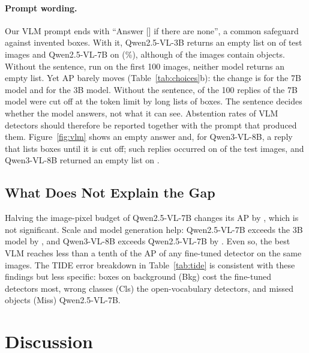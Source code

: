 \documentclass[letterpaper]{article} %
\begin{document}
\paragraph{Prompt wording.}
\label{sec:prompt}
Our VLM prompt ends with ``Answer [] if there are none'', a common safeguard against invented boxes. With it, Qwen2.5-VL-3B returns an empty list on \nEmptyQThree{} of \nRepQThree{} test images and Qwen2.5-VL-7B on \nEmptyQSeven{} (\pctEmptyQSeven\%), although \nImagesWithObjects{} of the images contain objects. Without the sentence, run on the first 100 images, neither model returns an empty list. Yet AP barely moves (Table~\ref{tab:choices}b): the change is \dPromptSeven{} \dciPromptSeven{} for the 7B model and \dPromptThree{} \dciPromptThree{} for the 3B model. Without the sentence, \nCutQSevenNoEmpty{} of the 100 replies of the 7B model were cut off at the token limit by long lists of boxes. The sentence decides whether the model answers, not what it can see. Abstention rates of VLM detectors should therefore be reported together with the prompt that produced them. Figure~\ref{fig:vlm} shows an empty answer and, for Qwen3-VL-8B, a reply that lists boxes until it is cut off; such replies occurred on \nCutQwenVL{} of the \nTestImages{} test images, and Qwen3-VL-8B returned an empty list on \nEmptyQwenVL.

\subsection{What Does Not Explain the Gap}



Halving the image-pixel budget of Qwen2.5-VL-7B changes its AP by \dResolution{} \dciResolution, which is not significant. Scale and model generation help: Qwen2.5-VL-7B exceeds the 3B model by \dSevenThree{} \dciSevenThree{}, and Qwen3-VL-8B exceeds Qwen2.5-VL-7B by \dQwenGenFull{} \dciQwenGenFull. Even so, the best VLM reaches less than a tenth of the AP of any fine-tuned detector on the same images. The TIDE error breakdown \citep{bolya2020tide} in Table~\ref{tab:tide} is consistent with these findings but less specific: boxes on background (Bkg) cost the fine-tuned detectors most, wrong classes (Cls) the open-vocabulary detectors, and missed objects (Miss) Qwen2.5-VL-7B.

\section{Discussion}
\label{sec:discussion}
\end{document}
